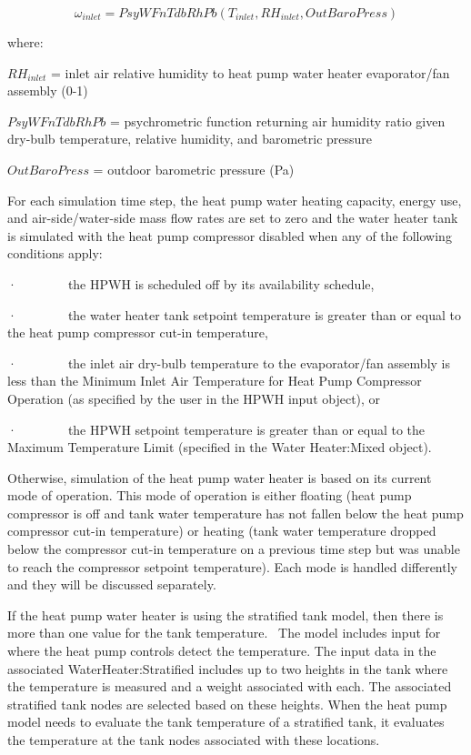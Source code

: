 \begin{equation}
{\omega_{inlet}} = PsyWFnTdbRhPb({T_{inlet}},R{H_{inlet}},OutBaroPress)
\end{equation}

where:

\(R{H_{inlet}}\) = inlet air relative humidity to heat pump water heater evaporator/fan assembly (0-1)

\(PsyWFnTdbRhPb\) = psychrometric function returning air humidity ratio given dry-bulb temperature, relative humidity, and barometric pressure

\(OutBaroPress\) = outdoor barometric pressure (Pa)

For each simulation time step, the heat pump water heating capacity, energy use, and air-side/water-side mass flow rates are set to zero and the water heater tank is simulated with the heat pump compressor disabled when any of the following conditions apply:

·~~~~~~~~the HPWH is scheduled off by its availability schedule,

·~~~~~~~~the water heater tank setpoint temperature is greater than or equal to the heat pump compressor cut-in temperature,

·~~~~~~~~the inlet air dry-bulb temperature to the evaporator/fan assembly is less than the Minimum Inlet Air Temperature for Heat Pump Compressor Operation (as specified by the user in the HPWH input object), or

·~~~~~~~~the HPWH setpoint temperature is greater than or equal to the Maximum Temperature Limit (specified in the Water Heater:Mixed object).

Otherwise, simulation of the heat pump water heater is based on its current mode of operation. This mode of operation is either floating (heat pump compressor is off and tank water temperature has not fallen below the heat pump compressor cut-in temperature) or heating (tank water temperature dropped below the compressor cut-in temperature on a previous time step but was unable to reach the compressor setpoint temperature). Each mode is handled differently and they will be discussed separately.

If the heat pump water heater is using the stratified tank model, then there is more than one value for the tank temperature.~ The model includes input for where the heat pump controls detect the temperature. The input data in the associated WaterHeater:Stratified includes up to two heights in the tank where the temperature is measured and a weight associated with each. The associated stratified tank nodes are selected based on these heights. When the heat pump model needs to evaluate the tank temperature of a stratified tank, it evaluates the temperature at the tank nodes associated with these locations.

